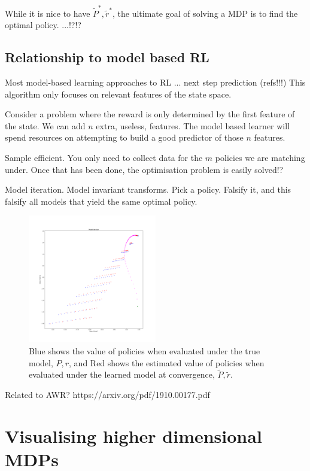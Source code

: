 While it is nice to have $\tilde P^{* }, \tilde r^{* }$, the ultimate goal of
solving a MDP is to find the optimal policy. ...!?!?

\subsection{Relationship to model based RL}

Most model-based learning approaches to RL ... next step prediction (refs!!!)
This algorithm only focuses on relevant features of the state space.

Consider a problem where the reward is only determined by the first feature of the state. We can add $n$ extra, useless, features.
The model based learner will spend resources on attempting to build a good predictor of those $n$ features.

Sample efficient. You only need to collect data for the $m$ policies we are matching under.
Once that has been done, the optimisation problem is easily solved!?

Model iteration. Model invariant transforms. Pick a policy. Falsify it,
and this falsify all models that yield the same optimal policy.

\begin{figure}
\centering
\includegraphics[width=0.5\textwidth,height=0.5\textheight]{../../pictures/figures/model_iteration.png}
\caption{Blue shows the value of policies when evaluated under the true model, $P, r$,
and Red shows the estimated value of policies when evaluated under the learned model at convergence, $\tilde P, \tilde r$.}
\end{figure}


Related to AWR? https://arxiv.org/pdf/1910.00177.pdf



\section{Visualising higher dimensional MDPs}

